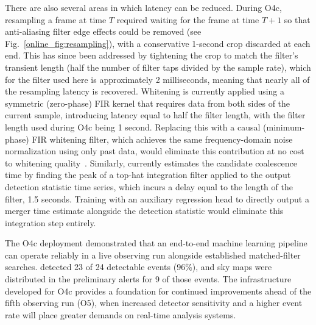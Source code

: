 \begin{refsection}
There are also several areas in which latency can be reduced.
During O4c, resampling a frame at time $T$ required waiting for the frame at time $T+1$ so that anti-aliasing filter edge effects could be removed (see Fig.~\ref{online_fig:resampling}), with a conservative 1-second crop discarded at each end.
This has since been addressed by tightening the crop to match the filter's transient length (half the number of filter taps divided by the sample rate), which for the filter used here is approximately 2 milliseconds, meaning that nearly all of the resampling latency is recovered.
Whitening is currently applied using a symmetric (zero-phase) FIR kernel that requires data from both sides of the current sample, introducing latency equal to half the filter length, with the filter length used during O4c being 1 second.
Replacing this with a causal (minimum-phase) FIR whitening filter, which achieves the same frequency-domain noise normalization using only past data, would eliminate this contribution at no cost to whitening quality~\cite{kennington2026gaugetheoreticsignalprocessing}.
Similarly, \aframe currently estimates the candidate coalescence time by finding the peak of a top-hat integration filter applied to the output detection statistic time series, which incurs a delay equal to the length of the filter, 1.5 seconds.
Training \aframe with an auxiliary regression head to directly output a merger time estimate alongside the detection statistic would eliminate this integration step entirely.

The O4c deployment demonstrated that an end-to-end machine learning pipeline can operate reliably in a live observing run alongside established matched-filter searches.
\aframe detected 23 of 24 detectable events (96\%), and \amplfi sky maps were distributed in the preliminary alerts for 9 of those events.
The infrastructure developed for O4c provides a foundation for continued improvements ahead of the fifth observing run (O5), when increased detector sensitivity and a higher event rate will place greater demands on real-time analysis systems.

\singlespacing
\printbibliography[title=References,heading=subbibintoc]
\end{refsection}